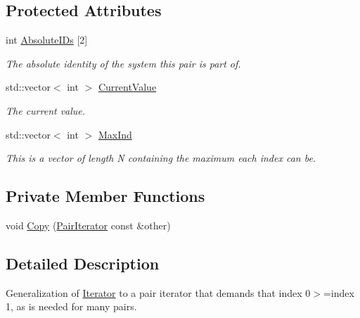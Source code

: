 \subsection*{Protected Attributes}
\begin{DoxyCompactItemize}
\item 
int \hyperlink{classJKBuilder_1_1PairIterator_a5c96d22e39dea8044c7caf8c1213e813}{AbsoluteIDs} \mbox{[}2\mbox{]}
\begin{DoxyCompactList}\small\item\em The absolute identity of the system this pair is part of. \item\end{DoxyCompactList}\item 
std::vector$<$ int $>$ \hyperlink{classJKBuilder_1_1Iterator_a20ca24f6d827aba144bb087c4bcb74a0}{CurrentValue}
\begin{DoxyCompactList}\small\item\em The current value. \item\end{DoxyCompactList}\item 
std::vector$<$ int $>$ \hyperlink{classJKBuilder_1_1Iterator_ab6b56d3c4e9353bc938dd6249cde9ca0}{MaxInd}
\begin{DoxyCompactList}\small\item\em This is a vector of length N containing the maximum each index can be. \item\end{DoxyCompactList}\end{DoxyCompactItemize}
\subsection*{Private Member Functions}
\begin{DoxyCompactItemize}
\item 
void \hyperlink{classJKBuilder_1_1PairIterator_ad9163efc0e961126baecc84da6555045}{Copy} (\hyperlink{classJKBuilder_1_1PairIterator}{PairIterator} const \&other)
\end{DoxyCompactItemize}


\subsection{Detailed Description}
Generalization of \hyperlink{classJKBuilder_1_1Iterator}{Iterator} to a pair iterator that demands that index 0$>$=index 1, as is needed for many pairs. 

